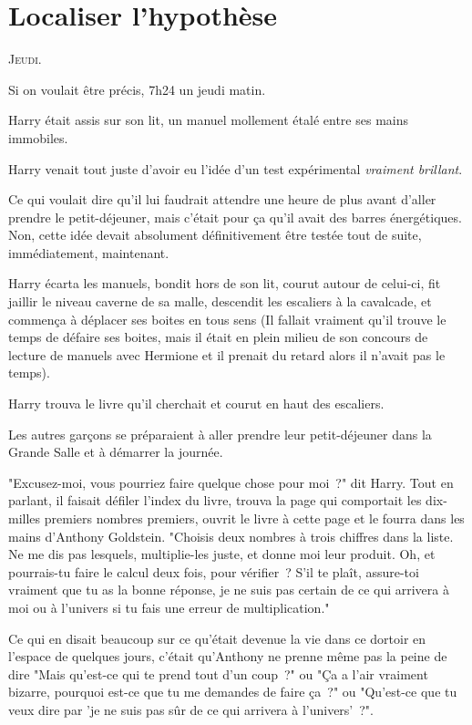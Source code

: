 \chapter{Localiser l'hypothèse}

\lettrine{J}{eudi}.

\hplettrineextrapara
Si on voulait être précis, 7h24 un jeudi matin.

Harry était assis sur son lit, un manuel mollement étalé entre ses mains immobiles.

Harry venait tout juste d'avoir eu l'idée d'un test expérimental \emph{vraiment brillant}.

Ce qui voulait dire qu'il lui faudrait attendre une heure de plus avant d'aller prendre le petit-déjeuner, mais c'était pour ça qu'il avait des barres énergétiques. Non, cette idée devait absolument définitivement être testée tout de suite, immédiatement, maintenant.

Harry écarta les manuels, bondit hors de son lit, courut autour de celui-ci, fit jaillir le niveau caverne de sa malle, descendit les escaliers à la cavalcade, et commença à déplacer ses boites en tous sens (Il fallait vraiment qu'il trouve le temps de défaire ses boites, mais il était en plein milieu de son concours de lecture de manuels avec Hermione et il prenait du retard alors il n'avait pas le temps).

Harry trouva le livre qu'il cherchait et courut en haut des escaliers.

Les autres garçons se préparaient à aller prendre leur petit-déjeuner dans la Grande Salle et à démarrer la journée.

"Excusez-moi, vous pourriez faire quelque chose pour moi~?" dit Harry. Tout en parlant, il faisait défiler l'index du livre, trouva la page qui comportait les dix-milles premiers nombres premiers, ouvrit le livre à cette page et le fourra dans les mains d'Anthony Goldstein. "Choisis deux nombres à trois chiffres dans la liste. Ne me dis pas lesquels, multiplie-les juste, et donne moi leur produit. Oh, et pourrais-tu faire le calcul deux fois, pour vérifier~? S'il te plaît, assure-toi vraiment que tu as la bonne réponse, je ne suis pas certain de ce qui arrivera à moi ou à l'univers si tu fais une erreur de multiplication."

Ce qui en disait beaucoup sur ce qu'était devenue la vie dans ce dortoir en l'espace de quelques jours, c'était qu'Anthony ne prenne même pas la peine de dire "Mais qu'est-ce qui te prend tout d'un coup~?" ou "Ça a l'air vraiment bizarre, pourquoi est-ce que tu me demandes de faire ça~?" ou "Qu'est-ce que tu veux dire par 'je ne suis pas sûr de ce qui arrivera à l'univers'~?".

